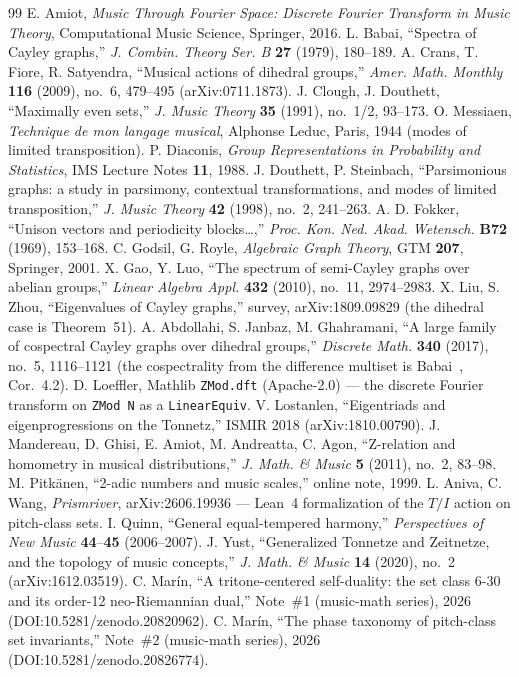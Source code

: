 \documentclass[11pt]{article}
\newcommand{\lean}[1]{\texttt{#1}}
\begin{document}
\begin{thebibliography}{99}
 E. Amiot, \emph{Music Through Fourier Space: Discrete Fourier Transform in Music Theory},
  Computational Music Science, Springer, 2016.
 L. Babai, ``Spectra of Cayley graphs,'' \emph{J. Combin. Theory Ser. B} \textbf{27} (1979),
  180--189.
 A. Crans, T. Fiore, R. Satyendra, ``Musical actions of dihedral groups,'' \emph{Amer. Math.
  Monthly} \textbf{116} (2009), no.~6, 479--495 (arXiv:0711.1873).
 J. Clough, J. Douthett, ``Maximally even sets,'' \emph{J. Music Theory}
  \textbf{35} (1991), no.~1/2, 93--173.
 O. Messiaen, \emph{Technique de mon langage musical}, Alphonse Leduc, Paris, 1944
  (modes of limited transposition).
 P. Diaconis, \emph{Group Representations in Probability and Statistics}, IMS Lecture Notes
  \textbf{11}, 1988.
 J. Douthett, P. Steinbach, ``Parsimonious graphs: a study in parsimony, contextual
  transformations, and modes of limited transposition,'' \emph{J. Music Theory} \textbf{42} (1998), no.~2,
  241--263.
 A. D. Fokker, ``Unison vectors and periodicity blocks\dots,'' \emph{Proc. Kon. Ned. Akad.
  Wetensch.} \textbf{B72} (1969), 153--168.
 C. Godsil, G. Royle, \emph{Algebraic Graph Theory}, GTM \textbf{207}, Springer, 2001.
 X. Gao, Y. Luo, ``The spectrum of semi-Cayley graphs over abelian groups,'' \emph{Linear
  Algebra Appl.} \textbf{432} (2010), no.~11, 2974--2983.
 X. Liu, S. Zhou, ``Eigenvalues of Cayley graphs,'' survey, arXiv:1809.09829
  (the dihedral case is Theorem~51).
 A. Abdollahi, S. Janbaz, M. Ghahramani, ``A large family of cospectral Cayley graphs over
  dihedral groups,'' \emph{Discrete Math.} \textbf{340} (2017), no.~5, 1116--1121 (the cospectrality from the
  difference multiset is Babai~\cite{Babai}, Cor.~4.2).
 D. Loeffler, Mathlib \lean{ZMod.dft} (Apache-2.0) --- the discrete Fourier transform on
  \lean{ZMod N} as a \lean{LinearEquiv}.
 V. Lostanlen, ``Eigentriads and eigenprogressions on the Tonnetz,'' ISMIR 2018
  (arXiv:1810.00790).
 J. Mandereau, D. Ghisi, E. Amiot, M. Andreatta, C. Agon, ``Z-relation and homometry in
  musical distributions,'' \emph{J. Math. \& Music} \textbf{5} (2011), no.~2, 83--98.
 M. Pitk\"anen, ``2-adic numbers and music scales,'' online note, 1999.
 L. Aniva, C. Wang, \emph{Prismriver}, arXiv:2606.19936 --- Lean~4 formalization of the
  $T/I$ action on pitch-class sets.
 I. Quinn, ``General equal-tempered harmony,'' \emph{Perspectives of New Music}
  \textbf{44}--\textbf{45} (2006--2007).
 J. Yust, ``Generalized Tonnetze and Zeitnetze, and the topology of music concepts,''
  \emph{J. Math. \& Music} \textbf{14} (2020), no.~2 (arXiv:1612.03519).
 C. Mar\'in, ``A tritone-centered self-duality: the set class 6-30 and its order-12
  neo-Riemannian dual,'' Note~\#1 (music-math series), 2026 (DOI:10.5281/zenodo.20820962).
 C. Mar\'in, ``The phase taxonomy of pitch-class set invariants,'' Note~\#2 (music-math
  series), 2026 (DOI:10.5281/zenodo.20826774).
\end{thebibliography}
\end{document}
